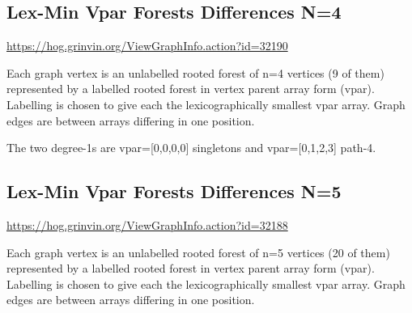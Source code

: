 \documentclass{article}
\begin{document}
\subsection{Lex-Min Vpar Forests Differences N=4}

\url{https://hog.grinvin.org/ViewGraphInfo.action?id=32190}

\smallskip

Each graph vertex is an unlabelled rooted forest of n=4 vertices (9 of
them) represented by a labelled rooted forest in vertex parent array
form (vpar).  Labelling is chosen to give each the lexicographically
smallest vpar array.  Graph edges are between arrays differing in one
position.

The two degree-1s are vpar=[0,0,0,0] singletons and vpar=[0,1,2,3] path-4.

\begin{center}
\end{center}


\subsection{Lex-Min Vpar Forests Differences N=5}

\url{https://hog.grinvin.org/ViewGraphInfo.action?id=32188}

\smallskip

Each graph vertex is an unlabelled rooted forest of n=5 vertices (20
of them) represented by a labelled rooted forest in vertex parent
array form (vpar).  Labelling is chosen to give each the
lexicographically smallest vpar array.  Graph edges are between arrays
differing in one position.
\end{document}
